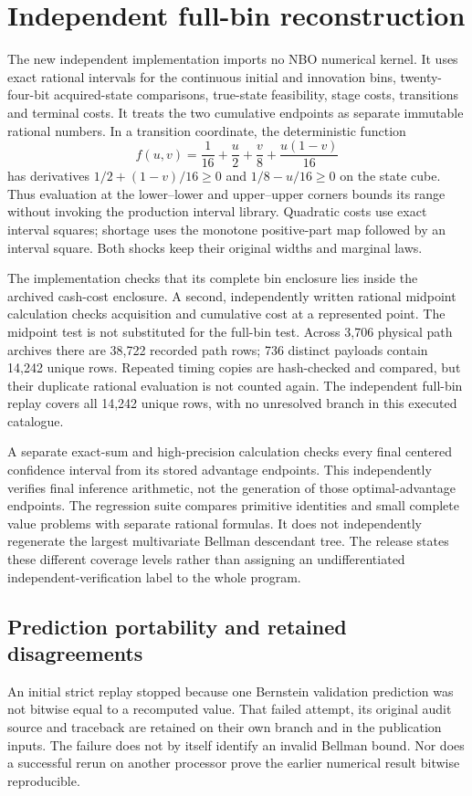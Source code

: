 \section{Independent full-bin reconstruction}\label{supp:independent70}
The new independent implementation imports no NBO numerical kernel. It uses exact rational intervals for the continuous initial and innovation bins, twenty-four-bit acquired-state comparisons, true-state feasibility, stage costs, transitions and terminal costs. It treats the two cumulative endpoints as separate immutable rational numbers. In a transition coordinate, the deterministic function
\[
 f(u,v)=\frac1{16}+\frac u2+\frac v8+\frac{u(1-v)}{16}
\]
has derivatives $1/2+(1-v)/16\ge0$ and $1/8-u/16\ge0$ on the state cube. Thus evaluation at the lower--lower and upper--upper corners bounds its range without invoking the production interval library. Quadratic costs use exact interval squares; shortage uses the monotone positive-part map followed by an interval square. Both shocks keep their original widths and marginal laws.

The implementation checks that its complete bin enclosure lies inside the archived cash-cost enclosure. A second, independently written rational midpoint calculation checks acquisition and cumulative cost at a represented point. The midpoint test is not substituted for the full-bin test. Across 3,706 physical path archives there are 38,722 recorded path rows; 736 distinct payloads contain 14,242 unique rows. Repeated timing copies are hash-checked and compared, but their duplicate rational evaluation is not counted again. The independent full-bin replay covers all 14,242 unique rows, with no unresolved branch in this executed catalogue.

A separate exact-sum and high-precision calculation checks every final centered confidence interval from its stored advantage endpoints. This independently verifies final inference arithmetic, not the generation of those optimal-advantage endpoints. The regression suite compares primitive identities and small complete value problems with separate rational formulas. It does not independently regenerate the largest multivariate Bellman descendant tree. The release states these different coverage levels rather than assigning an undifferentiated independent-verification label to the whole program.

\subsection{Prediction portability and retained disagreements}
An initial strict replay stopped because one Bernstein validation prediction was not bitwise equal to a recomputed value. That failed attempt, its original audit source and traceback are retained on their own branch and in the publication inputs. The failure does not by itself identify an invalid Bellman bound. Nor does a successful rerun on another processor prove the earlier numerical result bitwise reproducible.

